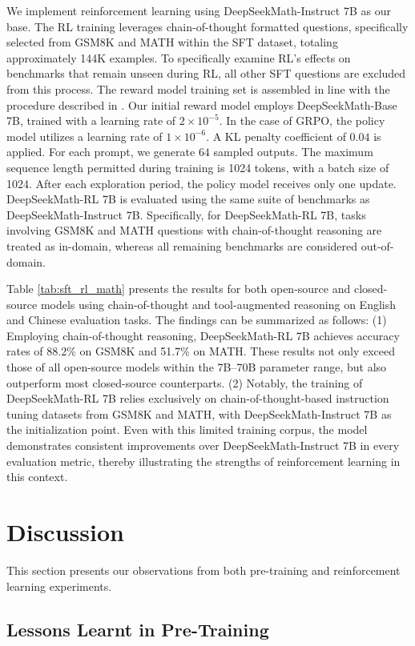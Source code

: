 \begin{itemize}[topsep=0pt]
We implement reinforcement learning using DeepSeekMath-Instruct 7B as our base. The RL training leverages chain-of-thought formatted questions, specifically selected from GSM8K and MATH within the SFT dataset, totaling approximately 144K examples. To specifically examine RL's effects on benchmarks that remain unseen during RL, all other SFT questions are excluded from this process. The reward model training set is assembled in line with the procedure described in \citep{wang2023math}. Our initial reward model employs DeepSeekMath-Base 7B, trained with a learning rate of $2 \times 10^{-5}$. In the case of GRPO, the policy model utilizes a learning rate of $1 \times 10^{-6}$. A KL penalty coefficient of $0.04$ is applied. For each prompt, we generate $64$ sampled outputs. The maximum sequence length permitted during training is 1024 tokens, with a batch size of 1024. After each exploration period, the policy model receives only one update. DeepSeekMath-RL 7B is evaluated using the same suite of benchmarks as DeepSeekMath-Instruct 7B. Specifically, for DeepSeekMath-RL 7B, tasks involving GSM8K and MATH questions with chain-of-thought reasoning are treated as in-domain, whereas all remaining benchmarks are considered out-of-domain.

Table \ref{tab:sft_rl_math} presents the results for both open-source and closed-source models using chain-of-thought and tool-augmented reasoning on English and Chinese evaluation tasks. The findings can be summarized as follows: (1) Employing chain-of-thought reasoning, DeepSeekMath-RL 7B achieves accuracy rates of 88.2\% on GSM8K and 51.7\% on MATH. These results not only exceed those of all open-source models within the 7B–70B parameter range, but also outperform most closed-source counterparts. (2) Notably, the training of DeepSeekMath-RL 7B relies exclusively on chain-of-thought-based instruction tuning datasets from GSM8K and MATH, with DeepSeekMath-Instruct 7B as the initialization point. Even with this limited training corpus, the model demonstrates consistent improvements over DeepSeekMath-Instruct 7B in every evaluation metric, thereby illustrating the strengths of reinforcement learning in this context.

\section{Discussion}
This section presents our observations from both pre-training and reinforcement learning experiments.

\subsection{Lessons Learnt in Pre-Training}


\end{itemize}
